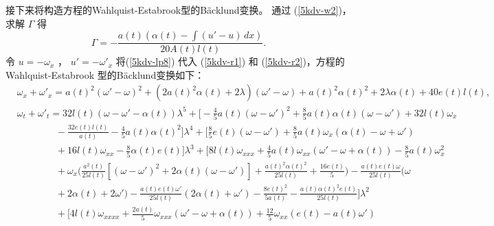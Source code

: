 接下来将构造方程的Wahlquist-Estabrook型的B\"{a}cklund变换。
通过 (\ref{5kdv-w2})， 求解 $\Gamma$ 得
\begin{equation}
\Gamma= -\frac{a(t) (\alpha(t)-\int (u'-u) \, dx)}{20 A(t) l(t)} .\label{5kdv-lp8}
\end{equation}
令 $u=-\omega_x$ ， $u'=-\omega'_x$ 将(\ref{5kdv-lp8}) 代入 (\ref{5kdv-r1}) 和 (\ref{5kdv-r2})，方程的Wahlquist-Estabrook 型的B\"{a}cklund变换如下：
\begin{align}
&\omega_x + \omega'_x =a(t)^2 (\omega'-\omega)^2+ (2 a(t)^2 \alpha(t)+2\lambda) (\omega'-\omega)
 +a(t)^2 \alpha(t)^2+2 \lambda  \alpha(t)+40 e(t) l(t), \label{5kdv-w7} \\ \nonumber
\nonumber
&\omega_t + \omega'_t =32l(t)( \omega - \omega'-\alpha(t))\lambda ^5+\big[-\frac{4}{5} a(t)( \omega-  \omega')^2 +\frac{8}{5} a(t) \alpha(t)(\omega  - \omega') +32 l(t) \omega_x
 \\ \nonumber
& \quad\quad\quad\quad
-\frac{32 e(t) l(t) }{a(t)}-\frac{4}{5} a(t) \alpha(t)^2 \big]\lambda ^4
 +\big[\frac{8}{5} e(t) (\omega- \omega') +\frac{8}{5} a(t) \omega_x  (\alpha(t)- \omega   + \omega' )
 \\ \nonumber
& \quad\quad\quad\quad
+16 l(t) \omega_{xx}-\frac{8}{5} \alpha(t) e(t)\big]\lambda ^3 +\big[8 l(t) \omega_{xxx} +\frac{4}{5} a(t) \omega_{xx}(\omega'- \omega+ \alpha(t))-\frac{8}{5} a(t)
 \omega_{x}^2 \\
\nonumber
& \quad\quad\quad\quad
+\omega_{x}\big(\frac{a^2(t)}{25l(t)}[(\omega- \omega')^2 + 2 \alpha(t)(\omega- \omega')] +\frac{a(t)^2 \alpha(t)^2}{25 l(t)}+\frac{16 e(t)}{5}\big) -\frac{a(t) e(t) \omega }{25 l(t)}(\omega
 \\ \nonumber
& \quad\quad\quad\quad
+2 \alpha(t) + 2  \omega')-\frac{a(t) e(t) \omega'}{25 l(t)}( 2 \alpha(t)+ \omega') -\frac{8 e(t)^2}{5 a(t)}-\frac{a(t) \alpha(t)^2 e(t)}{25 l(t)}\big] \lambda ^2 \\
\nonumber
& \quad\quad\quad\quad
+\big[4l(t) \omega_{xxxx}+ \frac{2 a(t)}{5}\omega_{xxx}( \omega'- \omega+ \alpha(t)) +\frac{12}{5}\omega_{xx}
(e(t) - a(t) \omega')
\end{align}
